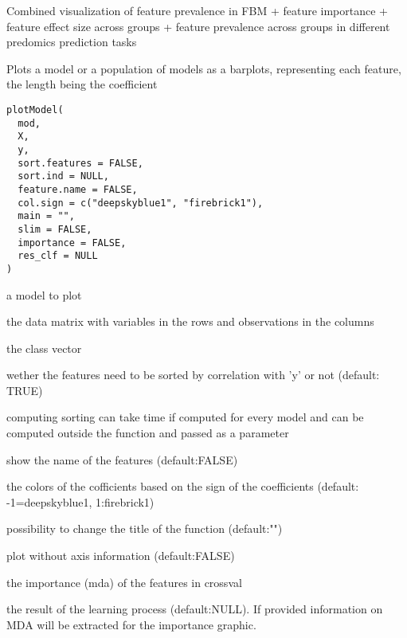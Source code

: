 \documentclass[a4paper]{book}
\begin{document}
%
\begin{Value}
Combined visualization of feature prevalence in FBM + feature importance + feature effect size across groups + feature prevalence across groups in different predomics prediction tasks
\end{Value}
%
\begin{Description}
Plots a model or a population of models as a barplots, representing each feature, the length being the coefficient
\end{Description}
%
\begin{Usage}
\begin{verbatim}
plotModel(
  mod,
  X,
  y,
  sort.features = FALSE,
  sort.ind = NULL,
  feature.name = FALSE,
  col.sign = c("deepskyblue1", "firebrick1"),
  main = "",
  slim = FALSE,
  importance = FALSE,
  res_clf = NULL
)
\end{verbatim}
\end{Usage}
%
\begin{Arguments}
\begin{ldescription}
\item[\code{mod:}] a model to plot

\item[\code{X:}] the data matrix with variables in the rows and observations in the columns

\item[\code{y:}] the class vector

\item[\code{sort.features:}] wether the features need to be sorted by correlation with 'y' or not (default: TRUE)

\item[\code{sort.ind:}] computing sorting can take time if computed for every model and can be computed outside the function and passed as a parameter

\item[\code{feature.name:}] show the name of the features (default:FALSE)

\item[\code{col.sign:}] the colors of the cofficients based on the sign of the coefficients (default: -1=deepskyblue1, 1:firebrick1)

\item[\code{main:}] possibility to change the title of the function (default:"")

\item[\code{slim:}] plot without axis information (default:FALSE)

\item[\code{importance:}] the importance (mda) of the features in crossval

\item[\code{res\_clf:}] the result of the learning process (default:NULL). If provided information on MDA will be extracted for the importance graphic.
\end{ldescription}
\end{Arguments}
\end{document}

